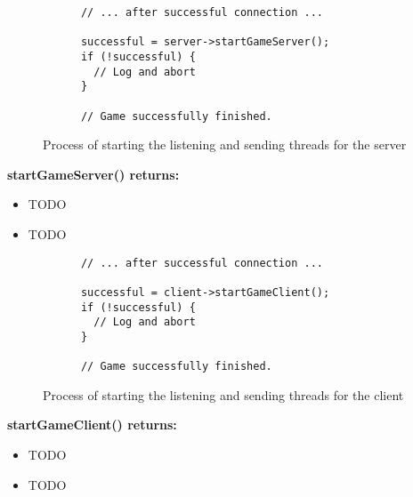\begin{figure}[!h]
  \centering
  \begin{lstlisting}
      // ... after successful connection ...

      successful = server->startGameServer();
      if (!successful) {
        // Log and abort
      }

      // Game successfully finished.
  \end{lstlisting}
  \caption{Process of starting the listening and sending threads for the server}
  \label{code:server_game}
\end{figure}
\textbf{startGameServer() returns:}
\begin{itemize}
\item TODO

\item TODO
\end{itemize}


\begin{figure}[!h]
  \centering
  \begin{lstlisting}
      // ... after successful connection ...

      successful = client->startGameClient();
      if (!successful) {
        // Log and abort
      }

      // Game successfully finished.
  \end{lstlisting}
  \caption{Process of starting the listening and sending threads for the client}
  \label{code:client_game}
\end{figure}
\textbf{startGameClient() returns:}
\begin{itemize}
\item TODO

\item TODO
\end{itemize}
